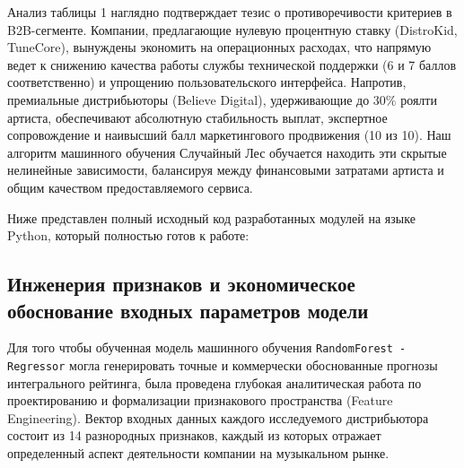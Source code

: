 \documentclass[14pt, a4paper]{extarticle}
\begin{document}
\newpage
Анализ таблицы 1 наглядно подтверждает тезис о противоречивости критериев в B2B-сегменте. Компании, предлагающие нулевую процентную ставку (DistroKid, TuneCore), вынуждены экономить на операционных расходах, что напрямую ведет к снижению качества работы службы технической поддержки (6 и 7 баллов соответственно) и упрощению пользовательского интерфейса. Напротив, премиальные дистрибьюторы (Believe Digital), удерживающие до $30\%$ роялти артиста, обеспечивают абсолютную стабильность выплат, экспертное сопровождение и наивысший балл маркетингового продвижения (10 из 10). Наш алгоритм машинного обучения Случайный Лес обучается находить эти скрытые нелинейные зависимости, балансируя между финансовыми затратами артиста и общим качеством предоставляемого сервиса.

Ниже представлен полный исходный код разработанных модулей на языке Python, который полностью готов к работе:
\subsection{Инженерия признаков и экономическое обоснование входных параметров модели}
Для того чтобы обученная модель машинного обучения \texttt{RandomForest - Regressor} могла генерировать точные и коммерчески обоснованные прогнозы интегрального рейтинга, была проведена глубокая аналитическая работа по проектированию и формализации признакового пространства (Feature Engineering). Вектор входных данных каждого исследуемого дистрибьютора состоит из 14 разнородных признаков, каждый из которых отражает определенный аспект деятельности компании на музыкальном рынке. 
\end{document}
